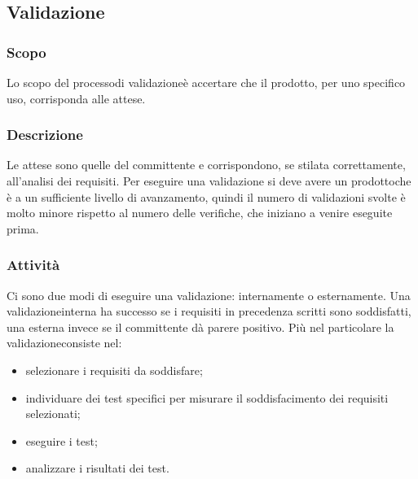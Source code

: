 \subsection{Validazione}

\subsubsection{Scopo}
Lo scopo del processo\glosp di validazione\glosp è accertare che il prodotto\glo, per uno specifico uso, corrisponda alle attese.

\subsubsection{Descrizione}
Le attese sono quelle del committente e corrispondono, se stilata correttamente, all'analisi dei requisiti. 
Per eseguire una validazione si deve avere un prodotto\glosp che è a un sufficiente livello di avanzamento, quindi il numero di validazioni svolte è molto minore rispetto al numero delle verifiche, che iniziano a venire eseguite prima.

\subsubsection{Attività}
Ci sono due modi di eseguire una validazione\glo: internamente o esternamente. Una validazione\glosp interna ha successo se i requisiti in precedenza scritti sono soddisfatti, una esterna invece se il committente dà parere positivo. Più nel particolare la validazione\glosp consiste nel:

\begin{itemize}
	\item selezionare i requisiti da soddisfare;
	\item individuare dei test specifici per misurare il soddisfacimento dei requisiti selezionati;
	\item eseguire i test;
	\item analizzare i risultati dei test.
\end{itemize}

